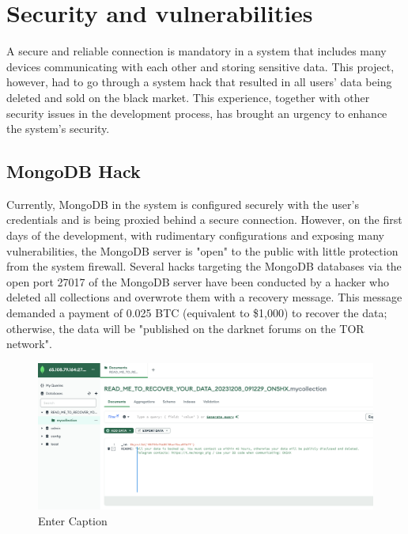 \documentclass[../Main.tex]{subfiles}
\begin{document}
\section{Security and vulnerabilities}
A secure and reliable connection is mandatory in a system that includes many devices communicating with each other and storing sensitive data. This project, however, had to go through a system hack that resulted in all users' data being deleted and sold on the black market. This experience, together with other security issues in the development process, has brought an urgency to enhance the system's security.
\subsection{MongoDB Hack}
Currently, MongoDB in the system is configured securely with the user's credentials and is being proxied behind a secure connection. However, on the first days of the development, with rudimentary configurations and exposing many vulnerabilities, the MongoDB server is "open" to the public with little protection from the system firewall. Several hacks targeting the MongoDB databases via the open port 27017 of the MongoDB server have been conducted by a hacker who deleted all collections and overwrote them with a recovery message. This message demanded a payment of 0.025 BTC (equivalent to \$1,000) to recover the data; otherwise, the data will be "published on the darknet forums on the TOR network".
\begin{figure}[H]
    \centering
    \includegraphics[width=0.9\linewidth]{doc//thesis//EN//imgs/mongo-hack.png}
    \caption{Enter Caption}
    \label{fig:enter-label}
\end{figure}
\end{document}
